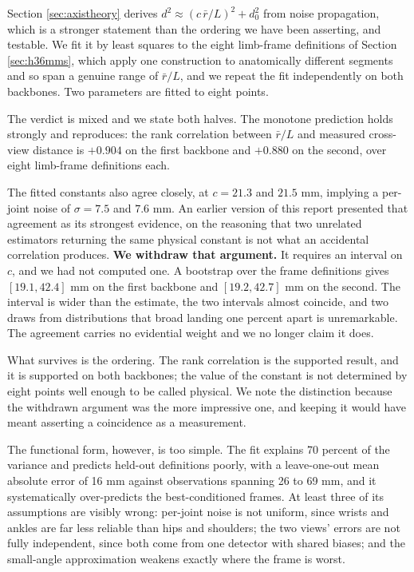 \documentclass[12pt,a4paper]{report}
\begin{document}
Section \ref{sec:axistheory} derives $d^{2} \approx (c\,\bar{r}/L)^{2} + d_0^{2}$ from noise propagation, which is a stronger statement than the ordering we have been asserting, and testable. We fit it by least squares to the eight limb-frame definitions of Section \ref{sec:h36mms}, which apply one construction to anatomically different segments and so span a genuine range of $\bar{r}/L$, and we repeat the fit independently on both backbones. Two parameters are fitted to eight points.

The verdict is mixed and we state both halves. The monotone prediction holds strongly and reproduces: the rank correlation between $\bar{r}/L$ and measured cross-view distance is $+0.904$ on the first backbone and $+0.880$ on the second, over eight limb-frame definitions each.

The fitted constants also agree closely, at $c = 21.3$ and $21.5$ mm, implying a per-joint noise of $\sigma = 7.5$ and $7.6$ mm. An earlier version of this report presented that agreement as its strongest evidence, on the reasoning that two unrelated estimators returning the same physical constant is not what an accidental correlation produces. \textbf{We withdraw that argument.} It requires an interval on $c$, and we had not computed one. A bootstrap over the frame definitions gives $[19.1, 42.4]$ mm on the first backbone and $[19.2, 42.7]$ mm on the second. The interval is wider than the estimate, the two intervals almost coincide, and two draws from distributions that broad landing one percent apart is unremarkable. The agreement carries no evidential weight and we no longer claim it does.

What survives is the ordering. The rank correlation is the supported result, and it is supported on both backbones; the value of the constant is not determined by eight points well enough to be called physical. We note the distinction because the withdrawn argument was the more impressive one, and keeping it would have meant asserting a coincidence as a measurement.

The functional form, however, is too simple. The fit explains 70 percent of the variance and predicts held-out definitions poorly, with a leave-one-out mean absolute error of 16 mm against observations spanning 26 to 69 mm, and it systematically over-predicts the best-conditioned frames. At least three of its assumptions are visibly wrong: per-joint noise is not uniform, since wrists and ankles are far less reliable than hips and shoulders; the two views' errors are not fully independent, since both come from one detector with shared biases; and the small-angle approximation weakens exactly where the frame is worst.
\end{document}
